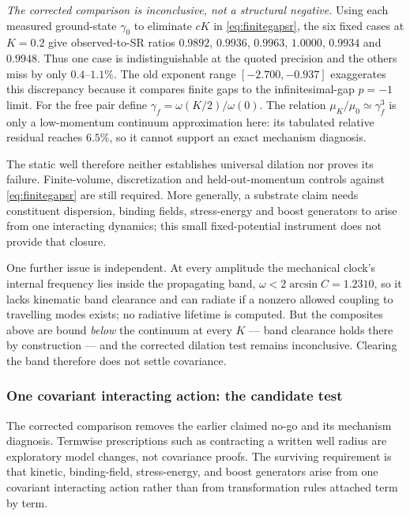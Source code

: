 \documentclass[11pt,a4paper]{article}
\theoremstyle{definition}
\theoremstyle{plain}
\theoremstyle{remark}
\begin{document}
\emph{The corrected comparison is inconclusive, not a structural negative.}
Using each measured ground-state $\gamma_0$ to eliminate $cK$ in
\eqref{eq:finitegapsr}, the six fixed cases at $K=0.2$ give observed-to-SR
ratios $0.9892$, $0.9936$, $0.9963$, $1.0000$, $0.9934$ and $0.9948$.
Thus one case is indistinguishable at the quoted precision and the others
miss by only $0.4$--$1.1\%$. The old exponent range
$[-2.700,-0.937]$ exaggerates this discrepancy because it compares finite
gaps to the infinitesimal-gap $p=-1$ limit. For the free pair define
$\gamma_f=\omega(K/2)/\omega(0)$. The relation
$\mu_K/\mu_0\simeq\gamma_f^3$ is only a low-momentum continuum approximation
here: its tabulated relative residual reaches $6.5\%$, so it cannot support an
exact mechanism diagnosis.

The static well therefore neither establishes universal dilation nor proves
its failure. Finite-volume, discretization and held-out-momentum controls
against \eqref{eq:finitegapsr} are still required. More generally, a
substrate claim needs constituent dispersion, binding fields, stress-energy
and boost generators to arise from one interacting dynamics; this small
fixed-potential instrument does not provide that closure.

One further issue is independent. At every amplitude the mechanical clock's
internal frequency lies inside the propagating band,
$\omega < 2\arcsin C = 1.2310$, so it lacks kinematic band clearance and
can radiate if a nonzero allowed coupling to travelling modes exists; no
radiative lifetime is computed. But the composites above are bound \emph{below} the
continuum at every $K$ --- band clearance holds there by construction ---
and the corrected dilation test remains inconclusive. Clearing the band
therefore does not settle covariance.

\subsubsection{One covariant interacting action: the candidate test}
\label{sec:oneenergy}

The corrected comparison removes the earlier claimed no-go and its
mechanism diagnosis. Termwise prescriptions such as contracting a written
well radius are exploratory model changes, not covariance proofs. The
surviving requirement is that
kinetic, binding-field, stress-energy, and boost generators arise from one
covariant interacting action rather than from transformation rules attached
term by term.
\end{document}
